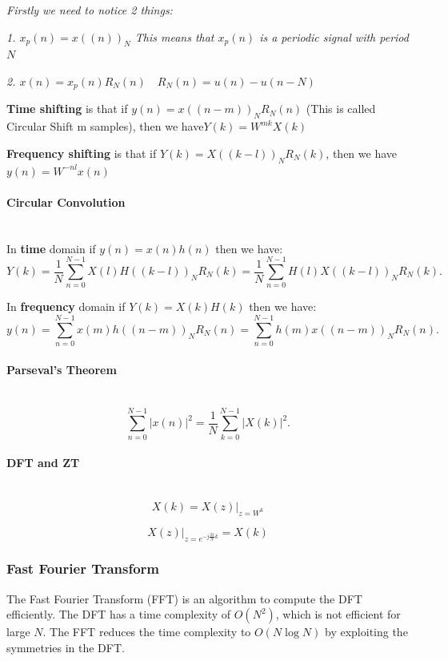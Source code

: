 \documentclass[12pt]{ctexart}
\begin{document}
\textit{Firstly we need to notice 2 things:}

\textit{1. $x_p(n) = x((n))_N$ This means that $x_p(n)$ is a periodic signal with 
period $N$}

\textit{2. $x(n) = x_p(n)R_N(n) \quad R_N(n) = u(n) - u(n-N)$}

\textbf{Time shifting} is that if $y(n) = x((n-m))_NR_N(n)$ (This is called Circular
Shift m samples), then we have$Y(k) = W^{mk}X(k)$

\textbf{Frequency shifting} is that if $Y(k) = X((k-l))_NR_N(k)$, then we have
$y(n) = W^{-nl}x(n)$

\paragraph{\textbf{Circular Convolution}}\mbox{}\\

In \textbf{time} domain if $y(n) = x(n)h(n)$ then we have:
\[
 Y(k) = \frac{1}{N}\sum_{n=0}^{N-1} X(l)H((k-l))_NR_N(k) = \frac{1}{N}\sum_{n=0}^{N-1}
H(l)X((k-l))_NR_N(k).
\]

In \textbf{frequency} domain if $Y(k) = X(k)H(k)$ then we have:
\[
  y(n) = \sum_{n=0}^{N-1} x(m)h((n-m))_NR_N(n) = \sum_{n=0}^{N-1} h(m)x((n-m))_NR_N(n).
\]

\paragraph{\textbf{Parseval's Theorem}}\mbox{}\\
\[
  \sum_{n=0}^{N-1} |x(n)|^2 = \frac{1}{N}\sum_{k=0}^{N-1} |X(k)|^2.
\]

\paragraph{\textbf{DFT and ZT}}\mbox{}\\
\[
  X(k) = X(z)|_{z=W^k}
\]

\[
  X(z)|_{z=e^{-j\frac{2\pi}{N}k}} = X(k)
\]

\subsubsection{\textbf{Fast Fourier Transform}}

The Fast Fourier Transform (FFT) is an algorithm to compute the DFT efficiently. The DFT
has a time complexity of $O(N^2)$, which is not efficient for large $N$. The FFT reduces
the time complexity to $O(N\log N)$ by exploiting the symmetries in the DFT.
\end{document}
